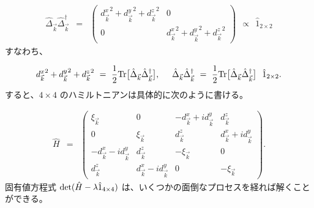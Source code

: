 \documentclass[uplatex,a4j,12pt,dvipdfmx]{jsarticle}
\begin{document}
\begin{eqnarray}
	\hat{\Delta}_{\vec{k}} \hat{\Delta}^{\dagger}_{\vec{k}}
	&=&
	\left(
	\begin{array}{cc}
			{d^{x}_{\vec{k}}}^{2} + {d^{y}_{\vec{k}}}^{2} + {d^{z}_{\vec{k}}}^{2} & 0                                                                     \\[3mm]
			0                                                                     & {d^{x}_{\vec{k}}}^{2} + {d^{y}_{\vec{k}}}^{2} + {d^{z}_{\vec{k}}}^{2}
		\end{array}
	\right)
	\ \ \propto \ \
	\hat{1}_{2 \times 2}
\end{eqnarray}
%
すなわち、

\begin{eqnarray}
	{d^{x}_{\vec{k}}}^{2} + {d^{y}_{\vec{k}}}^{2} + {d^{z}_{\vec{k}}}^{2}
	\ = \
	\dfrac{1}{2}
	{\rm Tr} \big[ \hat{\Delta}_{\vec{k}} \hat{\Delta}^{\dagger}_{\vec{k}} \big]
	, \hspace{5mm}
	\hat{\Delta}_{\vec{k}} \hat{\Delta}^{\dagger}_{\vec{k}}
	\ = \
	\dfrac{1}{2}
	{\rm Tr} \big[ \hat{\Delta}_{\vec{k}} \hat{\Delta}^{\dagger}_{\vec{k}} \big]
	\ \
	\hat{1}_{2 \times 2}
	.
\end{eqnarray}
%
すると、$4 \times 4$ のハミルトニアンは具体的に次のように書ける。

\begin{eqnarray}
	\hat{H}
	&=&
	\left(
	\begin{array}{cccc}
			\xi_{\vec{k}}                         & 0                                   & - d^{x}_{\vec{k}} + i d^{y}_{\vec{k}} & d^{z}_{\vec{k}}                     \\[2mm]
			0                                     & \xi_{\vec{k}}                       & d^{z}_{\vec{k}}                       & d^{x}_{\vec{k}} + i d^{y}_{\vec{k}} \\[2mm]
			- d^{x}_{\vec{k}} - i d^{y}_{\vec{k}} & d^{z}_{\vec{k}}                     & - \xi_{\vec{k}}                       & 0                                   \\[2mm]
			d^{z}_{\vec{k}}                       & d^{x}_{\vec{k}} - i d^{y}_{\vec{k}} & 0                                     & - \xi_{\vec{k}}
		\end{array}
	\right)
	.
\end{eqnarray}
%
固有値方程式 ${\rm det}(\hat{H} - \lambda \hat{1}_{4 \times 4})$ は、いくつかの面倒なプロセスを経れば解くことができる。
\end{document}
